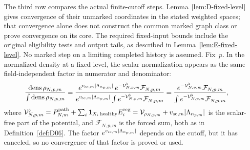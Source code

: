 The third row compares the actual finite-cutoff steps. Lemma~\ref{lem:D-fixed-level} gives convergence of their unmarked coordinates in the stated weighted spaces; that convergence alone does not construct the common marked graph class or prove convergence on its core. The required fixed-input bounds include the original eligibility tests and output tails, as described in Lemma~\ref{lem:E-fixed-level}. No marked step on a limiting completed history is assumed. Fix~$p$. In the normalized density at a fixed level, the scalar normalization appears as the same field-independent factor in numerator and denominator:
\begin{equation}\label{eq:E-normalized-density}
\frac{\operatorname{dens}\rho_{N,p,m}}{\int\operatorname{dens}\rho_{N,p,m}}
=\frac{e^{v_{{\rm sc},m}|\Lambda_{n_{p,m}}|}\,e^{-\mathcal V^\flat_{N,p,m}}\mathcal F_{N,p,m}}
{e^{v_{{\rm sc},m}|\Lambda_{n_{p,m}}|}\int e^{-\mathcal V^\flat_{N,p,m}}\mathcal F_{N,p,m}}
=\frac{e^{-\mathcal V^\flat_{N,p,m}}\mathcal F_{N,p,m}}
{\int e^{-\mathcal V^\flat_{N,p,m}}\mathcal F_{N,p,m}},
\end{equation}
where $\mathcal V^\flat_{N,p,m}=P^{\mathrm{path}}_{N,m}+\sum_i\mathbf1_{X_i\,\mathrm{healthy}}E_i^{\rm reg}=\mathcal V_{\rho_{N,p,m}}+v_{{\rm sc},m}|\Lambda_{n_{p,m}}|$ is the scalar-free part of the potential, and $\mathcal F_{N,p,m}$ is the forced sum, both as in Definition~\ref{def:D06}. The factor $e^{v_{{\rm sc},m}|\Lambda_{n_{p,m}}|}$ depends on the cutoff, but it has canceled, so no convergence of that factor is proved or used.



